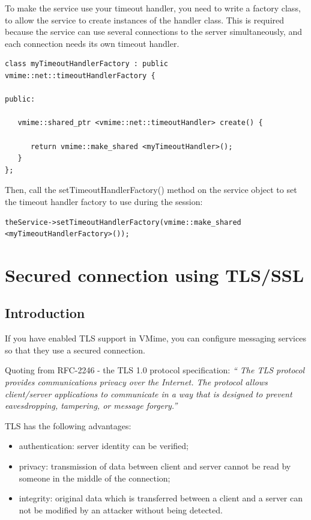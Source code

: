 To make the service use your timeout handler, you need to write a factory
class, to allow the service to create instances of the handler class. This
is required because the service can use several connections to the server
simultaneously, and each connection needs its own timeout handler.

\begin{lstlisting}
class myTimeoutHandlerFactory : public vmime::net::timeoutHandlerFactory {

public:

   vmime::shared_ptr <vmime::net::timeoutHandler> create() {

      return vmime::make_shared <myTimeoutHandler>();
   }
};
\end{lstlisting}

Then, call the {\vcode setTimeoutHandlerFactory()} method on the service object
to set the timeout handler factory to use during the session:

\begin{lstlisting}
theService->setTimeoutHandlerFactory(vmime::make_shared <myTimeoutHandlerFactory>());
\end{lstlisting}


\newpage
\section{Secured connection using TLS/SSL}

\subsection{Introduction} %

If you have enabled TLS support in VMime, you can configure messaging services
so that they use a secured connection.

Quoting from RFC-2246 - the TLS 1.0 protocol specification: \emph{`` The TLS
protocol provides communications privacy over the Internet. The protocol
allows client/server applications to communicate in a way that is designed
to prevent eavesdropping, tampering, or message forgery.''}

TLS has the following advantages:

\begin{itemize}
\item authentication: server identity can be verified;
\item privacy: transmission of data between client and server cannot be read
by someone in the middle of the connection;
\item integrity: original data which is transferred between a client and a
server can not be modified by an attacker without being detected.
\end{itemize}

